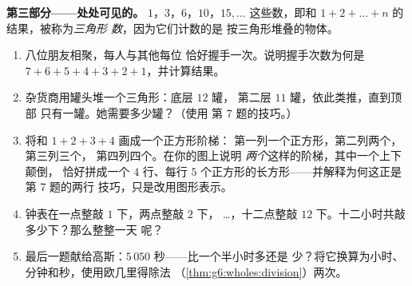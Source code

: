 \begin{problem}
\medskip
\noindent\textbf{第三部分——处处可见的。}
$1$，$3$，$6$，$10$，$15, \dots$ 这些数，即和
$1 + 2 + \dots + n$ 的结果，被称为\emph{三角形
数}，因为它们计数的是
按三角形堆叠的物体。
\begin{enumerate}[resume]
  \item 八位朋友相聚，每人与其他每位
        恰好握手一次。说明握手次数为何是
        $7 + 6 + 5 + 4 + 3 + 2 + 1$，并计算结果。
  \item 杂货商用罐头堆一个三角形：底层 $12$ 罐，
        第二层 $11$ 罐，依此类推，直到顶部
        只有一罐。她需要多少罐？（使用
        第 7 题的技巧。）
  \item 将和 $1 + 2 + 3 + 4$ 画成一个正方形阶梯：
        第一列一个正方形，第二列两个，第三列三个，
        第四列四个。在你的图上说明
        \emph{两个}这样的阶梯，其中一个上下颠倒，
        恰好拼成一个 $4$ 行、每行
        $5$ 个正方形的长方形——并解释为何这正是第 7 题的两行
        技巧，只是改用图形表示。
  \item 钟表在一点整敲 $1$ 下，两点整敲 $2$ 下，
        \dots，十二点整敲 $12$ 下。十二小时共敲
        多少下？那么整整一天
        呢？
  \item 最后一题献给高斯：$5\,050$ 秒——比一个半小时多还是
        少？将它换算为小时、
        分钟和秒，使用欧几里得除法
        （\cref{thm:g6:wholes:division}）两次。
\end{enumerate}
\end{problem}
